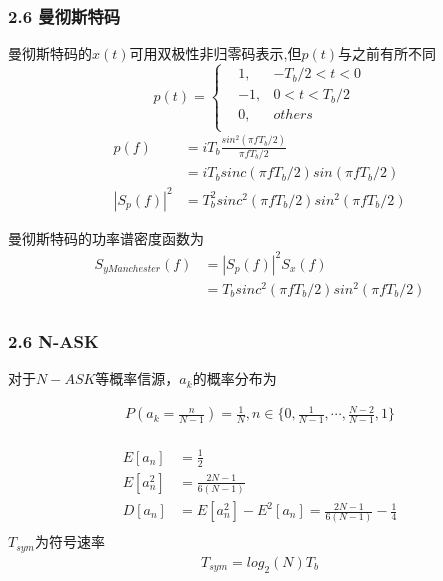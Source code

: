 \documentclass[
]{article}
\begin{document}
\hypertarget{header-n26}{%
\subsubsection{2.6 曼彻斯特码}\label{header-n26}}
曼彻斯特码的$x(t)$可用双极性非归零码表示,但$p(t)$与之前有所不同\\
\begin{equation}
p(t) =\left\{
\begin{aligned}
&1, & -T_b/2 < t < 0\\
&-1, & 0 < t < T_b/2\\
&0, & others \\
\end{aligned}
\right.
\end{equation}
\begin{equation}
\begin{aligned}
p(f) &= i T_b \frac{sin^2(\pi f T_b/2)}{\pi f T_b/2}\\
&= i T_b sinc(\pi f T_b/2) sin(\pi f T_b/2)\\
{\left| S_p(f) \right|}^2 & = T_b^2 sinc^2(\pi f T_b/2) sin^2(\pi f T_b/2)
\end{aligned}
\end{equation}

曼彻斯特码的功率谱密度函数为\\
\begin{equation}
\begin{aligned}
S_{yManchester}(f) &= {\left| S_p(f) \right|}^2 S_x(f) \\
&= T_b sinc^2(\pi f T_b/2) sin^2(\pi f T_b/2) \\
\end{aligned}
\end{equation}

\hypertarget{header-n26}{%
\subsubsection{2.6 N-ASK}\label{header-n26}}
对于$N-ASK$等概率信源，$a_k$的概率分布为

\begin{equation}
\begin{aligned}
P(a_k= \frac{n}{N-1}) = \frac{1}{N}, n \in \{0,\frac{1}{N-1},\cdots,\frac{N-2}{N-1},1\}\\
\end{aligned}
\end{equation}

\begin{equation}
\begin{aligned}
E[a_n] &= \frac{1}{2}\\
E[a_n^2] &= \frac{2N-1}{6(N-1)}\\
D[a_n] &= E[a_n^2] - E^2[a_n]=\frac{2N-1}{6(N-1)} - \frac{1}{4}\\
\end{aligned}
\end{equation}
$T_{sym}$为符号速率
\begin{equation}
\begin{aligned}
T_{sym} = log_2(N) T_b\\
\end{aligned}
\end{equation}
\end{document}
